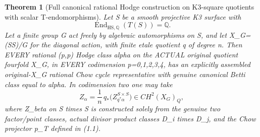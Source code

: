 \documentclass[11pt]{article}
\newtheorem{theorem}{Theorem}[section]
\begin{document}
\begin{theorem}[Full canonical rational Hodge construction on K3-square quotients with scalar T-endomorphisms]
Let S be a smooth projective K3 surface with
\[
 \boxed{\operatorname{End}_{\mathrm{HS},\mathbb Q}(T(S))=\mathbb Q.}
                                                               \tag{6.1}
\]
Let a finite group G act freely by algebraic automorphisms
on S, and let X_G=(S\times S)/G for the diagonal action,
with finite etale quotient q of degree n.
Then EVERY rational (p,p) Hodge class alpha on the
ACTUAL original quotient fourfold X_G, in EVERY
codimension p=0,1,2,3,4, has an explicitly assembled
original-X_G rational Chow cycle representative with
genuine canonical Betti class equal to alpha.
In codimension two one may take
\[
 \boxed{
 Z_\alpha=\frac1n\,q_*
       \bigl(Z_{q^*\alpha}^{S\times S}\bigr)
       \in CH^2(X_G)_Q,}
                                                               \tag{6.2}
\]
where Z_beta on S times S is constructed solely from
the genuine two factor/point classes, actual divisor
product classes D_i times D_j, and the Chow
projector p_T defined in (1.1).
\end{theorem}
\end{document}
